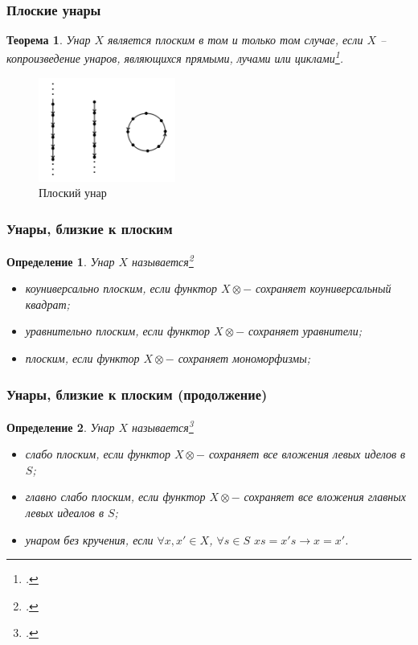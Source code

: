 \documentclass[11pt, notheorems]{beamer}
\newtheorem{definition}{Определение}
\newtheorem{theorem}{Теорема}
\begin{document}
\begin{frame}
	\frametitle{Плоские унары}

	\begin{theorem}
		Унар $X$ является плоским в том и только том случае, если $X$ -- копроизведение унаров, являющихся прямыми, лучами или циклами\footcite[теорема]{flat_unars}.
	\end{theorem}

	\begin{figure}
		\center
		\includegraphics[width=0.4\textwidth]{flat_unar_1.png}
		\caption{Плоский унар}
	\end{figure}
\end{frame}

\begin{frame}
	\frametitle{Унары, близкие к плоским}

	\begin{definition}
		Унар $X$ называется\footcite[определения III.9.1 и III.8.1]{kilp}

		\begin{itemize}
			\item коуниверсально плоским, если функтор $X \otimes - $ сохраняет коуниверсальный квадрат;
			\item уравнительно плоским, если функтор $X \otimes - $ сохраняет уравнители;
			\item плоским, если функтор $X \otimes - $ сохраняет мономорфизмы;
		\end{itemize}
	\end{definition}
\end{frame}

\begin{frame}
	\frametitle{Унары, близкие к плоским (продолжение)}

	\begin{definition}
		Унар $X$ называется\footcite[определения III.9.1 и III.8.1]{kilp}

		\begin{itemize}
			\item слабо плоским, если функтор $X \otimes - $ сохраняет все вложения левых иделов в $S$;
			\item главно слабо плоским, если функтор $X \otimes - $ сохраняет все вложения главных левых идеалов в $S$;
			\item унаром без кручения, если $\forall x, x' \in X$, $\forall s \in S$ $xs = x's \rightarrow x = x'$.
		\end{itemize}

	\end{definition}
\end{frame}
\end{document}
